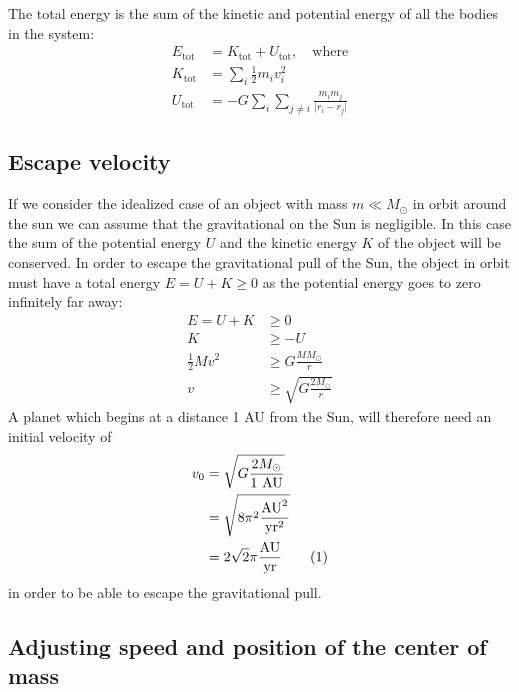 \documentclass[reprint, english,notitlepage,nofootinbib]{revtex4-1}  %
\newcommand\numberthis{\addtocounter{equation}{1}\tag{\theequation}}
\begin{document}
The total energy is the sum of the kinetic and potential energy of all the bodies in the system:
\begin{align*}
  E_{\text{tot}} &= K_{\text{tot}} + U_{\text{tot}}, \quad \text{where} \\
  K_{\text{tot}} &= \sum_i \frac{1}{2} m_i v_i^2 \\
  U_{\text{tot}} &= - G \sum_i \sum_{j \neq i} \frac{m_i m_j}{\lvert r_i - r_j \rvert}
\end{align*}


\subsection{Escape velocity}

If we consider the idealized case of an object with mass $m \ll M_\odot$ in orbit around the sun we can assume that the gravitational on the Sun is negligible. In this case the sum of the potential energy $U$ and the kinetic energy $K$ of the object will be conserved. In order to escape the gravitational pull of the Sun, the object in orbit must have a total energy $E = U + K \ge 0$ as the potential energy goes to zero infinitely far away:
\begin{align*}
  E = U + K &\ge 0 \\
  K &\ge - U \\
  \frac{1}{2} M v^2 &\ge G \frac{M M_\odot}{r} \\
  v &\ge \sqrt{G \frac{2 M_\odot}{r}}
\end{align*}
A planet which begins at a distance 1 AU from the Sun, will therefore need an initial velocity of
\begin{align*}
  v_0 &= \sqrt{G \frac{2 M_\odot}{1 \text{ AU}}} \\
  &= \sqrt{8 \pi^2 \frac{\text{AU}^2}{\text{yr}^2}} \\
  &= 2 \sqrt 2 \pi \frac{\text{AU}}{\text{yr}} \numberthis \label{eq:escape_velocity}
\end{align*}
in order to be able to escape the gravitational pull.


\subsection{Adjusting speed and position of the center of mass}
\end{document}
